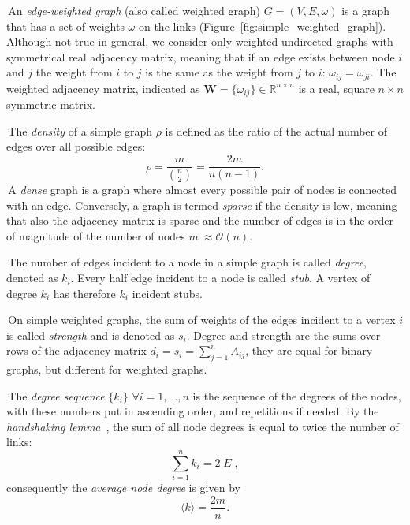 \noindent\textbullet \,An \emph{edge-weighted graph} (also called weighted graph) $G=(V,E,\omega)$ is a graph that has a set of weights $\omega$ on the links (Figure~\ref{fig:simple_weighted_graph}).
Although not true in general, we consider only weighted undirected graphs with symmetrical real adjacency matrix, meaning that if an edge exists between node $i$ and $j$ the weight from $i$ to $j$ is the same as the weight from $j$ to $i$: $\omega_{ij}=\omega_{ji}$.
The weighted adjacency matrix,  indicated as $\mathbf{W}=\{ \omega_{ij} \} \in \mathbb{R}^{n\times n}$ is a real, square $n \times n$ symmetric matrix.

\noindent\textbullet \,The \emph{density} of a simple graph $\rho$ is defined as the ratio of the actual number of edges over all possible edges:
\begin{equation}
\rho = \frac{m}{\binom{n}{2}} = \frac{2m}{n(n-1)}.
\end{equation}
\noindent\textbullet \,A \emph{dense} graph is a graph where almost every possible pair of nodes is connected with an edge.
Conversely, a graph is termed \emph{sparse} if the density is low, meaning that also the adjacency matrix is sparse and the number of edges is in the order of magnitude of the number of nodes $m ~\approx \mathcal{O}(n)$.

\noindent\textbullet \,The number of edges incident to a node in a simple graph is called \emph{degree}, denoted as $k_i$.
Every half edge incident to a node is called \emph{stub}. A vertex of degree $k_i$ has therefore $k_i$ incident stubs.

\noindent\textbullet \,On simple weighted graphs, the sum of weights of the edges incident to a vertex $i$ is called \emph{strength} and is denoted as $s_i$.
Degree and strength are the sums over rows of the adjacency matrix $d_i=s_i=\sum_{j=1}^n A_{ij}$, they are equal for binary graphs, but different for weighted graphs.

\noindent\textbullet \,The \emph{degree sequence} $\{k_i\}$ $\forall i=1,\ldots,n$ is the sequence  of the degrees of the nodes, with these numbers put in ascending order, and repetitions if needed.
By the \emph{handshaking lemma}~\cite{leiserson2001}, the sum of all node degrees is equal to twice the number of links:
\begin{equation}
\label{eq:handshaking_lemma}
\sum_{i=1}^n k_i=2 |E|,
\end{equation}
consequently the \emph{average node degree} is given by
\begin{equation}
\langle  k \rangle = \frac{2m}{n}.
\end{equation}

